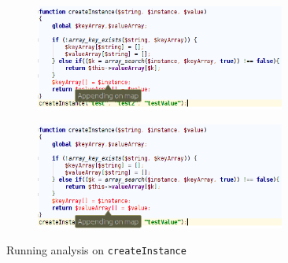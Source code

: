 \begin{figure}
\centering

\begin{subfigure}{\textwidth}
\centering
\includegraphics[width=0.9\textwidth]{chapters/caseStudy/newScreens/instance1}
\label{fig:typeHandlerScreenshot-1}
\end{subfigure}

\begin{subfigure}{\textwidth}
\centering
\includegraphics[width=0.9\textwidth]{chapters/caseStudy/newScreens/instance2}
\label{fig:typeHandlerScreenshot-2}
\end{subfigure}

\caption{Running analysis on \texttt{createInstance} }
\label{fig:typeHandlerScreenshot}
\end{figure}
